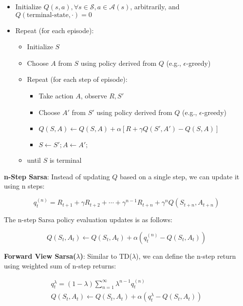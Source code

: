 \begin{itemize}
    \item Initialize $Q(s, a), \forall s \in \mathcal{S}, a \in \mathcal{A}(s)$,
          arbitrarily, and $Q(\text{terminal-state}, \cdot) = 0$
    \item Repeat (for each episode):
          \begin{itemize}
              \item Initialize $S$
              \item Choose $A$ from $S$ using policy derived from $Q$ (e.g., $\epsilon$-greedy)
              \item Repeat (for each step of episode):
                    \begin{itemize}
                        \item Take action $A$, observe $R, S'$
                        \item Choose $A'$ from $S'$ using policy derived from $Q$ (e.g., $\epsilon$-greedy)
                        \item $Q(S, A) \leftarrow Q(S, A) + \alpha[R + \gamma Q(S', A') - Q(S, A)]$
                        \item $S \leftarrow S'; A \leftarrow A';$
                    \end{itemize}
              \item until $S$ is terminal
          \end{itemize}
\end{itemize}

\noindent \textbf{n-Step Sarsa}: Instead of updating $Q$ based on a single step, we can update it using n steps:

\[
    q_t^{(n)} = R_{t+1} + \gamma R_{t+2} + \cdots + \gamma^{n-1} R_{t+n} + \gamma^n Q(S_{t+n}, A_{t+n})
\]

\noindent The n-step Sarsa policy evaluation updates is as follows:

\[
    Q(S_t, A_t) \leftarrow Q(S_t, A_t) + \alpha \left( q_t^{(n)} - Q(S_t, A_t) \right)
\]

\noindent \textbf{Forward View Sarsa($\lambda$)}: Similar to TD($\lambda$), we can define the
n-step return using weighted sum of n-step returns:

\begin{gather*}
    q_t^{\lambda} = (1 - \lambda) \sum_{n=1}^{\infty} \lambda^{n-1} q_t^{(n)} \\
    Q(S_t, A_t) \leftarrow Q(S_t, A_t) + \alpha \left( q_t^{\lambda} - Q(S_t, A_t) \right)
\end{gather*}

